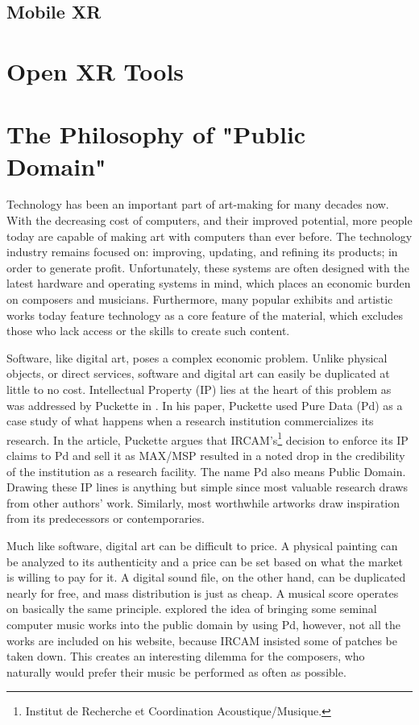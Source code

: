 \subsection{Mobile XR}
\section{Open XR Tools }

\section{The Philosophy of "Public Domain"}

Technology has been an important part of art-making for many decades now. With the decreasing cost of computers, and their improved potential, more people today are capable of making art with computers than ever before. The technology industry remains focused on: improving, updating, and refining its products; in order to generate profit. Unfortunately, these systems are often designed with the latest hardware and operating systems in mind, which places an economic burden on composers and musicians. Furthermore, many popular exhibits and artistic works today feature technology as a core feature of the material, which excludes those who lack access or the skills to create such content.

Software, like digital art, poses a complex economic problem. Unlike physical objects, or direct services, software and digital art can easily be duplicated at little to no cost. Intellectual Property (IP) lies at the heart of this problem as was addressed by Puckette in \cite{puckette2004owns}. In his paper, Puckette used Pure Data (Pd) as a case study of what happens when a research institution commercializes its research. In the article, Puckette argues that IRCAM's\footnote{Institut de Recherche et Coordination Acoustique/Musique.} decision to enforce its IP claims to Pd and sell it as MAX/MSP resulted in a noted drop in the credibility of the institution as a research facility. The name Pd also means Public Domain. Drawing these IP lines is anything but simple since most valuable research draws from other authors' work. Similarly, most worthwhile artworks draw inspiration from its predecessors or contemporaries.

Much like software, digital art can be difficult to price. A physical painting can be analyzed to its authenticity and a price can be set based on what the market is willing to pay for it. A digital sound file, on the other hand, can be duplicated nearly for free, and mass distribution is just as cheap. A musical score operates on basically the same principle. \cite{puckette2001new} explored the idea of bringing some seminal computer music works into the public domain by using Pd, however, not all the works are included on his website, because IRCAM insisted some of patches be taken down. This creates an interesting dilemma for the composers, who naturally would prefer their music be performed as often as possible. 

